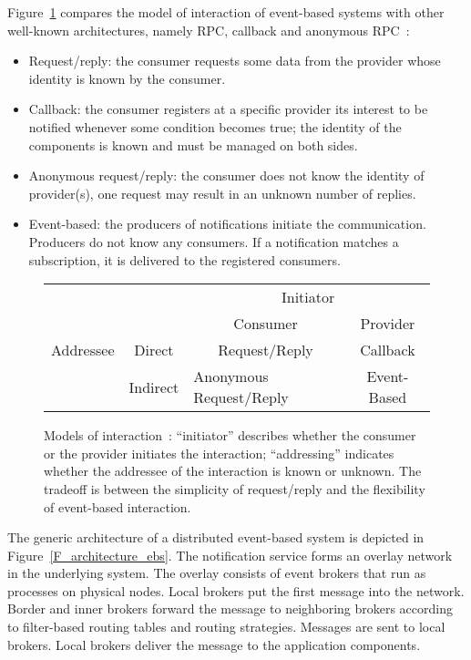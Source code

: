 Figure~\ref{F_models_interaction} compares the model of interaction of
event-based systems with other well-known architectures, namely RPC,
callback and anonymous RPC~\cite{ebs}:
\begin{itemize}
\item Request/reply: the consumer requests some data from the
provider whose identity is known by the consumer.
\item Callback: the consumer registers at a specific provider its
interest to be notified whenever some condition becomes true; the
identity of the components is known and must be managed on both sides.
\item Anonymous request/reply: the consumer does not know the identity
of provider(s), one request may result in an unknown number of replies.
\item Event-based: the producers of notifications initiate the
communication. Producers do not know any consumers. If
a notification matches a subscription, it is delivered to the
registered consumers.
\end{itemize}

\begin{figure}[htbp!]
\begin{center}
\begin{tabular}{c|c||p{3cm}|p{3cm}|}
\multicolumn{2}{c||}{} & \multicolumn{2}{|c|}{Initiator} \\ 
\multicolumn{2}{c||}{} & \multicolumn{1}{|c|}{Consumer}
& \multicolumn{1}{|c|}{Provider} \\
\hline
\hline
\multicolumn{1}{c|}{Addressee} & \multicolumn{1}{|c||}{Direct}
& \multicolumn{1}{|c|}{Request/Reply}
& \multicolumn{1}{|c|}{Callback}\\
\cline{2-4}
\multicolumn{1}{c|}{} & \multicolumn{1}{|c||}{Indirect} & {Anonymous
Request/Reply} & \multicolumn{1}{|c|}{Event-Based}\\
\hline 
\end{tabular}
\end{center}
\caption{Models of interaction~\cite{ebs}: ``initiator'' describes
  whether the consumer or the provider initiates the interaction;
  ``addressing'' indicates whether the addressee of the interaction is
  known or unknown. The tradeoff is between the simplicity of
  request/reply and the flexibility of event-based interaction.}
\label{F_models_interaction}
\end{figure}

The generic architecture of a distributed event-based system is
depicted in Figure~\ref{F_architecture_ebs}. The notification service
forms an overlay network in the underlying system. The overlay
consists of event brokers that run as processes on physical
nodes. Local brokers put the first message into the network. Border
and inner brokers forward the message to neighboring brokers according
to filter-based routing tables and routing strategies. Messages are
sent to local brokers. Local brokers deliver the message to the
application components.

